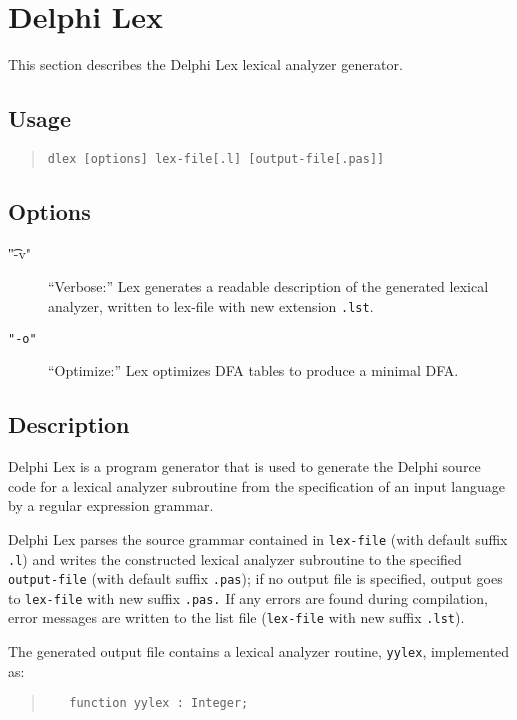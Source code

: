\documentclass[a4paper]{article}
\begin{document}
\newpage

\section{Delphi Lex}

This section describes the Delphi Lex lexical analyzer generator.

\subsection{Usage}

\begin{quote}\begin{verbatim}
dlex [options] lex-file[.l] [output-file[.pas]]
\end{verbatim}\end{quote}

\subsection{Options}

\begin{description}
   \item[\t"-v"]
      ``Verbose:'' Lex generates a readable description of the generated
      lexical analyzer, written to lex-file with new extension \verb".lst".
   \item[\tt"-o"]
      ``Optimize:'' Lex optimizes DFA tables to produce a minimal DFA.
\end{description}

\subsection{Description}

Delphi Lex is a program generator that is used to generate the Delphi
source code for a lexical analyzer subroutine from the specification
of an input language by a regular expression grammar.

Delphi Lex parses the source grammar contained in \verb"lex-file" (with default
suffix \verb".l") and writes the constructed lexical analyzer subroutine
to the specified \verb"output-file" (with default suffix \verb".pas"); if no
output file is specified, output goes to \verb"lex-file" with new suffix
\verb".pas." If any errors are found during compilation, error messages are
written to the list file (\verb"lex-file" with new suffix \verb".lst").

The generated output file contains a lexical analyzer routine, \verb"yylex",
implemented as:
\begin{quote}\begin{verbatim}
   function yylex : Integer;
\end{verbatim}\end{quote}
\end{document}

